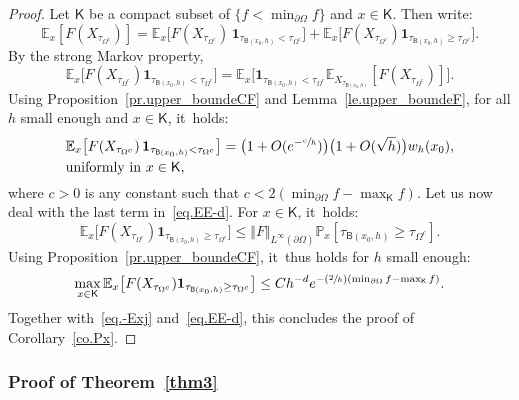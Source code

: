 \documentclass[10pt]{amsart}
\newcommand{\Psfrac}[2]{(\sfrac{#1}{#2})}
\theoremstyle{plain}
\theoremstyle{definition}
\begin{document}
\begin{proof}
Let $\mathsf K$ be a compact subset of $\{f<\min_{\partial \Omega}f\}$ and $x\in \mathsf K$. Then write:
\begin{equation}\label{eq.EE-d}
\mathbb E_{x} [F(X_{\tau_{\Omega^c}})]= \mathbb E_{x} \big [F(X_{\tau_{\Omega^c}})\, \mathbf{1}_{ \tau_{\mathsf B(x_0,h)}<\tau_{\Omega^c} }\big]+\mathbb E_{x} \big [F(X_{\tau_{\Omega^c}}) \mathbf{1}_{ \tau_{\mathsf B(x_0,h)}\ge \tau_{\Omega^c} }\big].
\end{equation}
By the strong Markov property,
\[
\mathbb E_{x} \big [F(X_{\tau_{\Omega^c}})\mathbf{1}_{ \tau_{\mathsf B(x_0,h)}<\tau_{\Omega^c} }\big]= \mathbb E_{x} \big [ \mathbf{1}_{ \tau_{\mathsf B(x_0,h)}<\tau_{\Omega^c} }\mathbb E_{X_{\tau_{\mathsf B(x_0,h)}}}[F(X_{\tau_{\Omega^c}})]\big].
\]
Using Proposition~\ref{pr.upper_boundeCF}
and Lemma~\ref{le.upper_boundeF}, for all $h$ small enough and $x\in \mathsf K$, it~holds:
\begin{equation}\label{eq.-Exj}
\begin{aligned}
& \mathbb E_{x} \big [F(X_{\tau_{\Omega^c}})\, \mathbf{1}_{
\tau_{\mathsf B (x_0,h)}<\tau_{\Omega^c} }\big]= \bigl(1+O(e^{-\sfrac
ch})\bigr)\bigl(1+O(\sqrt h)\bigr)w_h(x_0),\\
& \text{uniformly in $x\in \mathsf K$},
\end{aligned}
\end{equation}
where $c>0$ is any constant such that $c<2(\min_{\partial \Omega }f-\max_{\mathsf K} f)$. Let us now deal with the last term in~\eqref{eq.EE-d}.
For $x\in \mathsf K$, it~holds:
\[
\mathbb E_{x} \big [F(X_{\tau_{\Omega^c}}) \mathbf{1}_{ \tau_{\mathsf B(x_0,h)}\ge \tau_{\Omega^c} }\big]\le \Vert F\Vert _{L^\infty(\partial \Omega)} \mathbb P_{x} [\tau_{\mathsf B(x_0,h)}\ge \tau_{\Omega^c}].
\]
Using Proposition~\ref{pr.upper_boundeCF}, it~thus holds for $h$ small enough:\vspace*{-2pt}
\[
\max_{x\in \mathsf K}\mathbb E_{x} \big [F(X_{\tau_{\Omega^c}}) \mathbf{1}_{ \tau_{\mathsf B(x_0,h)}\ge \tau_{\Omega^c} }\big]\le Ch^{-d}e^{-\Psfrac 2h (\min_{\partial \Omega }f-\max_{\mathsf K} f)}.
\]
Together with~\eqref{eq.-Exj} and~\eqref{eq.EE-d}, this concludes the proof of Corollary~\ref{co.Px}.
\end{proof}

\subsubsection{Proof of Theorem~\ref{thm3}}
\end{document}
